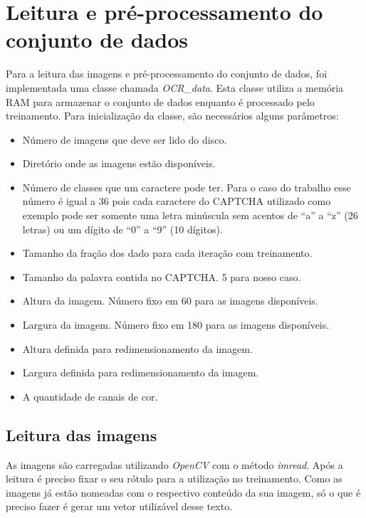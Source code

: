 \section{Leitura e pré-processamento do conjunto de dados}

Para a leitura das imagens e pré-processamento do conjunto de dados, foi
implementada uma classe chamada \textit{OCR\_data}. Esta classe utiliza
a memória RAM para armazenar o conjunto de dados enquanto é processado
pelo treinamento. Para inicialização da classe, são necessários alguns
parâmetros:

\begin{itemize}

  \item Número de imagens que deve ser lido do disco.
  \item Diretório onde as imagens estão disponíveis.
  \item Número de classes que um caractere pode ter. Para o caso do
    trabalho esse número é igual a 36 pois cada caractere do CAPTCHA
    utilizado como exemplo pode ser somente uma letra minúscula sem
    acentos de ``a'' a ``z'' (26 letras) ou um dígito de ``0'' a ``9''
    (10 dígitos).
  \item Tamanho da fração dos dado para cada iteração com treinamento.
  \item Tamanho da palavra contida no CAPTCHA. 5 para nosso caso.
  \item Altura da imagem. Número fixo em 60 para as imagens disponíveis.
  \item Largura da imagem. Número fixo em 180 para as imagens
    disponíveis.
  \item Altura definida para redimensionamento da imagem.
  \item Largura definida para redimensionamento da imagem.
  \item A quantidade de canais de cor.

\end{itemize}

\subsection{Leitura das imagens}

As imagens são carregadas utilizando \textit{OpenCV}\cite{OpenCV} com
o método \textit{imread}. Após a leitura é preciso fixar o seu rótulo
para a utilização no treinamento. Como as imagens já estão nomeadas
com o respectivo conteúdo da sua imagem, só o que é preciso fazer é
gerar um vetor utilizável desse texto. 

